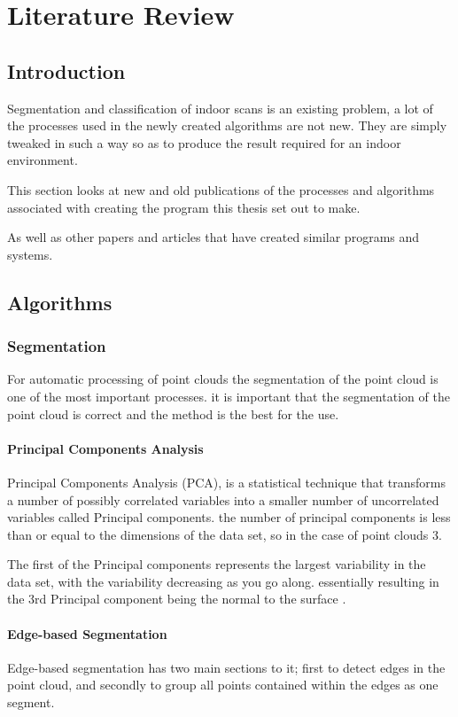 \chapter{Literature Review}
\section{Introduction}
	Segmentation and classification of indoor scans is an existing problem, a lot of the processes used in the newly created algorithms are not new. They are simply tweaked in such a way so as to produce the result required for an indoor environment. 
	
	This section looks at new and old publications of the processes and algorithms associated with creating the program this thesis set out to make.
	
	As well as other papers and articles that have created similar programs and systems.
	
\section{Algorithms}
	\subsection{Segmentation}
		For automatic processing of point clouds the segmentation of the point cloud is one of the most important processes. it is important that the segmentation of the point cloud is correct and the method is the best for the use.
		
		\subsubsection{Principal Components Analysis}
		Principal Components Analysis (PCA), is a statistical technique that transforms a number of possibly correlated variables into a smaller number of uncorrelated variables called Principal components. the number of principal components is less than or equal to the dimensions of the data set, so in the case of point clouds 3.
		
		The first of the Principal components represents the largest variability in the data set, with the variability decreasing as you go along. essentially resulting in the 3rd Principal component being the normal to the surface \citep{dunteman_principal_1989}. 
		
		
		\subsubsection{Edge-based Segmentation}
		Edge-based segmentation has two main sections to it; first to detect edges in the point cloud, and secondly to group all points contained within the edges as one segment.
		
